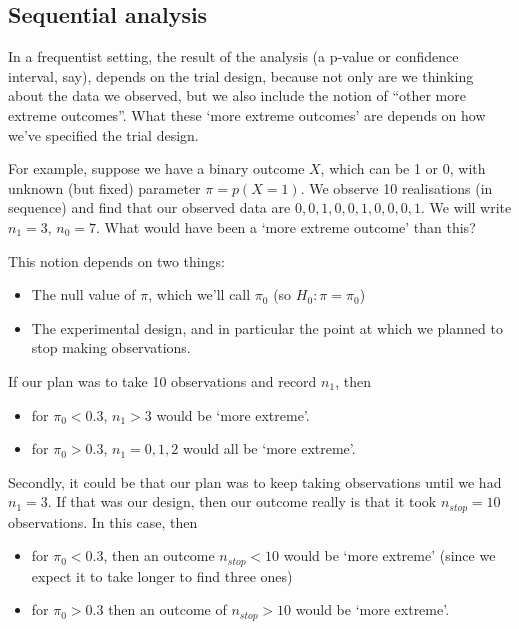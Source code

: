 \documentclass[
  openany]{book}
\providecommand{\tightlist}{%
  \setlength{\itemsep}{0pt}\setlength{\parskip}{0pt}}
\theoremstyle{definition}
\theoremstyle{definition}
\theoremstyle{definition}
\theoremstyle{definition}
\theoremstyle{remark}
\begin{document}
\subsection*{Sequential analysis}\label{sequential-analysis}

In a frequentist setting, the result of the analysis (a p-value or confidence interval, say), depends on the trial design, because not only are we thinking about the data we observed, but we also include the notion of ``other more extreme outcomes''. What these `more extreme outcomes' are depends on how we've specified the trial design.

For example, suppose we have a binary outcome \(X\), which can be 1 or 0, with unknown (but fixed) parameter \(\pi = p\left(X=1\right)\). We observe 10 realisations (in sequence) and find that our observed data are \(0, 0, 1, 0, 0, 1, 0, 0, 0, 1\). We will write \(n_1=3,\,n_0=7\). What would have been a `more extreme outcome' than this?

This notion depends on two things:

\begin{itemize}
\tightlist
\item
  The null value of \(\pi\), which we'll call \(\pi_0\) (so \(H_0: \pi=\pi_0\))
\item
  The experimental design, and in particular the point at which we planned to stop making observations.
\end{itemize}

If our plan was to take 10 observations and record \(n_1\), then

\begin{itemize}
\tightlist
\item
  for \(\pi_0<0.3\), \(n_1 > 3\) would be `more extreme'.
\item
  for \(\pi_0>0.3\), \(n_1 = 0,1,2\) would all be `more extreme'.
\end{itemize}

Secondly, it could be that our plan was to keep taking observations until we had \(n_1=3\). If that was our design, then our outcome really is that it took \(n_{stop}=10\) observations. In this case, then

\begin{itemize}
\tightlist
\item
  for \(\pi_0<0.3\), then an outcome \(n_{stop}<10\) would be `more extreme' (since we expect it to take longer to find three ones)
\item
  for \(\pi_0>0.3\) then an outcome of \(n_{stop}>10\) would be `more extreme'.
\end{itemize}
\end{document}
